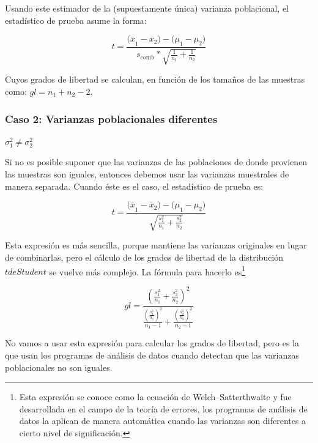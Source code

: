 \documentclass[]{book}
\let\rmarkdownfootnote\footnote%
\def\footnote{\protect\rmarkdownfootnote}
\begin{document}
Usando este estimador de la (supuestamente única) varianza poblacional,
el estadístico de prueba asume la forma:

\[t = \frac{{(\overline{x}}_{1} - {\overline{x}}_{2}) - {(\mu}_{1} - \mu_{2})}{s_{\text{comb}}*\sqrt{\frac{1}{n_{1}} + \frac{1}{n_{2}}}}\]

Cuyos grados de libertad se calculan, en función de los tamaños de las muestras como: \(gl = n_{1} + n_{2} - 2\).

\hypertarget{caso-2-varianzas-poblacionales-diferentes}{%
\subsubsection{Caso 2: Varianzas poblacionales diferentes}\label{caso-2-varianzas-poblacionales-diferentes}}

\(\sigma_{1}^{2} \neq \sigma_{2}^{2}\)

Si no es posible suponer que las varianzas de
las poblaciones de donde provienen las muestras son iguales, entonces
debemos usar las varianzas muestrales de manera separada. Cuando éste es
el caso, el estadístico de prueba es:

\[t = \frac{{(\overline{x}}_{1} - {\overline{x}}_{2}) - {(\mu}_{1} - \mu_{2})}{\sqrt{\frac{s_{1}^{2}}{n_{1}} + \frac{s_{2}^{2}}{n_{2}}}}\]

Esta expresión es más sencilla, porque mantiene las varianzas originales en lugar de combinarlas, pero el
cálculo de los grados de libertad de la distribución \(t de Student\) se
vuelve más complejo. La fórmula para hacerlo es\footnote{Esta expresión se conoce como la ecuación de Welch--Satterthwaite y fue desarrollada en el campo de la teoría de errores, los programas de análisis de datos la aplican de manera automática cuando las varianzas son diferentes a cierto nivel de significación.}

\[gl = \frac{\left( \frac{s_{1}^{2}}{n_{1}} + \frac{s_{2}^{2}}{n_{2}} \right)^{2}}{\frac{\left( \frac{s_{1}^{2}}{n_{1}} \right)^{2}}{n_{1} - 1} + \frac{\left( \frac{s_{2}^{2}}{n_{2}} \right)^{2}}{n_{2} - 1}}\]

No vamos a usar esta expresión para calcular los grados de libertad,
pero es la que usan los programas de análisis de datos cuando detectan
que las varianzas poblacionales no son iguales.
\end{document}

